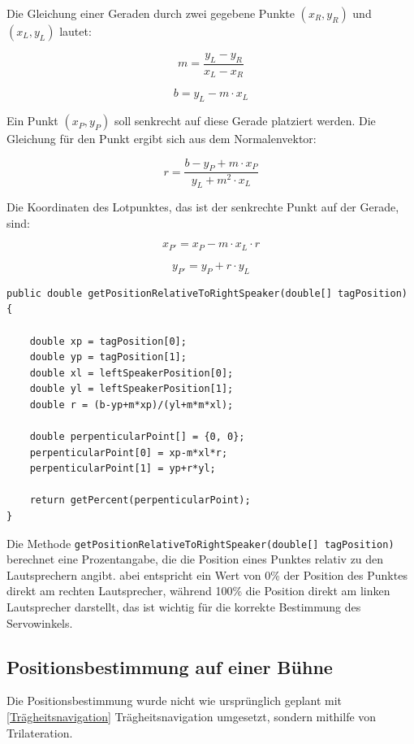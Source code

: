 Die Gleichung einer Geraden durch zwei gegebene Punkte \( (x_R, y_R) \) und \( (x_L, y_L) \) lautet:

\begin{equation*}
	m = \frac{y_L - y_R}{x_L - x_R}
\end{equation*}

\begin{equation*}
	b = y_L - m \cdot x_L
\end{equation*}

Ein Punkt \( (x_P, y_P) \) soll senkrecht auf diese Gerade platziert werden. Die Gleichung für den Punkt ergibt sich aus dem Normalenvektor:

\begin{equation*}
	r = \frac{b - y_P + m \cdot x_P}{y_L + m^2 \cdot x_L}
\end{equation*}

Die Koordinaten des Lotpunktes, das ist der senkrechte Punkt auf der Gerade, sind:

\begin{equation*}
	x_{P'} = x_P - m \cdot x_L \cdot r
\end{equation*}

\begin{equation*}
	y_{P'} = y_P + r \cdot y_L
\end{equation*}

\begin{lstlisting}[style=Java, caption=Auszug aus EqualizerSettingCalculator.java, captionpos=b]
public double getPositionRelativeToRightSpeaker(double[] tagPosition) {
	
	double xp = tagPosition[0];
	double yp = tagPosition[1];
	double xl = leftSpeakerPosition[0];
	double yl = leftSpeakerPosition[1];
	double r = (b-yp+m*xp)/(yl+m*m*xl);
	
	double perpenticularPoint[] = {0, 0};
	perpenticularPoint[0] = xp-m*xl*r;
	perpenticularPoint[1] = yp+r*yl;
	
	return getPercent(perpenticularPoint);
}
\end{lstlisting}

Die Methode \texttt{getPositionRelativeToRightSpeaker(double[] tagPosition)} berechnet eine Prozentangabe, die die Position eines Punktes relativ zu den Lautsprechern angibt. abei entspricht ein Wert von 0\% der Position des Punktes direkt am rechten Lautsprecher, während 100\% die Position direkt am linken Lautsprecher darstellt, das ist wichtig für die korrekte Bestimmung des Servowinkels.


\newpage
\subsection{Positionsbestimmung auf einer Bühne}
Die Positionsbestimmung wurde nicht wie ursprünglich geplant mit \ref{Trägheitsnavigation} Trägheitsnavigation umgesetzt, sondern mithilfe von Trilateration. 

